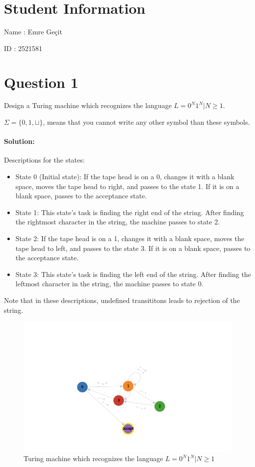 \documentclass[12pt]{article}
\begin{document}
\section*{Student Information}

Name : Emre Geçit

ID : 2521581

\section*{Question 1}
Design a Turing machine which recognizes the language $L = {0^N1^N | N \geq 1}$.

$\Sigma = \{0, 1, \sqcup\}$, means that you cannot write any other symbol than these symbols.
\paragraph{Solution:\\}
Descriptions for the states:
\begin{itemize}
    \item State 0 (Initial state): If the tape head is on a 0, changes it with a blank space, moves the tape head to right, and passes to the state 1. If it is on a blank space, passes to the acceptance state.
    \item State 1: This state's task is finding the right end of the string. After finding the rightmost character in the string, the machine passes to state 2.
    \item State 2: If the tape head is on a 1, changes it with a blank space, moves the tape head to left, and passes to the state 3. If it is on a blank space, passes to the acceptance state.
    \item State 3: This state's task is finding the left end of the string. After finding the leftmost character in the string, the machine passes to state 0.
\end{itemize}
Note that in these descriptions, undefined transititons leads to rejection of the string.
\begin{figure}[bp!]
    \caption{Turing machine which recognizes the language $L = {0^N1^N | N \geq 1}$}
    \centering
    \includegraphics[width=12cm]{Q1/turingmachine.io_.png}    
\end{figure}
\end{document}
